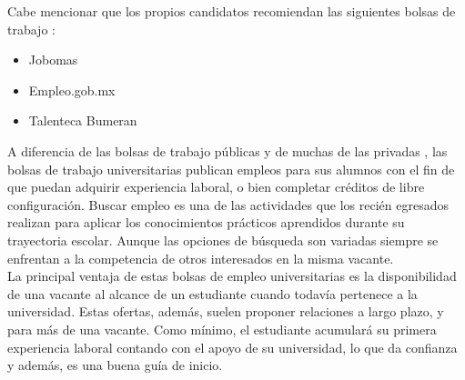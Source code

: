 Cabe mencionar que los propios candidatos recomiendan las siguientes bolsas de trabajo \cite{Evo} :
\begin{itemize}
    \item Jobomas
    \item Empleo.gob.mx 
    \item Talenteca Bumeran
\end{itemize}

A diferencia de las bolsas de trabajo públicas y de muchas de las privadas , las bolsas de trabajo universitarias publican empleos para sus alumnos con el fin de que puedan adquirir experiencia laboral, o bien completar créditos de libre configuración. Buscar empleo es una de las actividades que los recién egresados realizan para aplicar los conocimientos prácticos aprendidos durante su trayectoria escolar. Aunque las opciones de búsqueda son variadas siempre se enfrentan a la competencia de otros 
interesados en la misma vacante. \cite{UniJob}\\
\newline
La principal ventaja de estas bolsas de empleo universitarias es la disponibilidad de una vacante al alcance de un estudiante cuando todavía 
pertenece a la universidad. Estas ofertas, además, suelen proponer relaciones a largo plazo, y para más de una vacante. 
Como mínimo, el estudiante acumulará su primera experiencia laboral contando con el apoyo de su universidad, lo que da confianza y además, es una buena guía de inicio.

